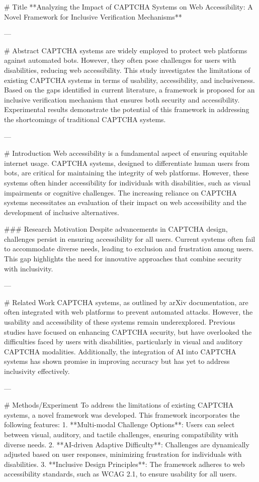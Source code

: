 # Title  
**Analyzing the Impact of CAPTCHA Systems on Web Accessibility: A Novel Framework for Inclusive Verification Mechanisms**

---

# Abstract  
CAPTCHA systems are widely employed to protect web platforms against automated bots. However, they often pose challenges for users with disabilities, reducing web accessibility. This study investigates the limitations of existing CAPTCHA systems in terms of usability, accessibility, and inclusiveness. Based on the gaps identified in current literature, a framework is proposed for an inclusive verification mechanism that ensures both security and accessibility. Experimental results demonstrate the potential of this framework in addressing the shortcomings of traditional CAPTCHA systems.

---

# Introduction  
Web accessibility is a fundamental aspect of ensuring equitable internet usage. CAPTCHA systems, designed to differentiate human users from bots, are critical for maintaining the integrity of web platforms. However, these systems often hinder accessibility for individuals with disabilities, such as visual impairments or cognitive challenges. The increasing reliance on CAPTCHA systems necessitates an evaluation of their impact on web accessibility and the development of inclusive alternatives.

### Research Motivation  
Despite advancements in CAPTCHA design, challenges persist in ensuring accessibility for all users. Current systems often fail to accommodate diverse needs, leading to exclusion and frustration among users. This gap highlights the need for innovative approaches that combine security with inclusivity.

---

# Related Work  
CAPTCHA systems, as outlined by arXiv documentation, are often integrated with web platforms to prevent automated attacks. However, the usability and accessibility of these systems remain underexplored. Previous studies have focused on enhancing CAPTCHA security, but have overlooked the difficulties faced by users with disabilities, particularly in visual and auditory CAPTCHA modalities. Additionally, the integration of AI into CAPTCHA systems has shown promise in improving accuracy but has yet to address inclusivity effectively.

---

# Methods/Experiment  
To address the limitations of existing CAPTCHA systems, a novel framework was developed. This framework incorporates the following features:
1. **Multi-modal Challenge Options**: Users can select between visual, auditory, and tactile challenges, ensuring compatibility with diverse needs.
2. **AI-driven Adaptive Difficulty**: Challenges are dynamically adjusted based on user responses, minimizing frustration for individuals with disabilities.
3. **Inclusive Design Principles**: The framework adheres to web accessibility standards, such as WCAG 2.1, to ensure usability for all users.

